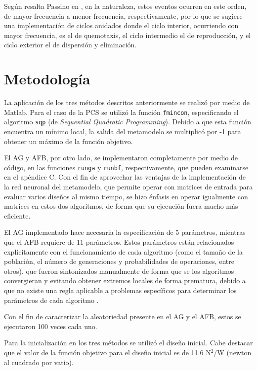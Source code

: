 Según resalta Passino en \cite{passino2002}, en la naturaleza, estos eventos ocurren en este orden, de mayor frecuencia a menor frecuencia, respectivamente, por lo que se sugiere una implementación de ciclos anidados donde el ciclo interior, ocurriendo con mayor frecuencia, es el de quemotaxis, el ciclo intermedio el de reproducción, y el ciclo exterior el de dispersión y eliminación.

\section{Metodología}
La aplicación de los tres métodos descritos anteriormente se realizó por medio de Matlab. Para el caso de la PCS se utilizó la función \texttt{fmincon}, especificando el algoritmo \texttt{sqp} (de \textit{Sequential Quadratic Programming}). Debido a que esta función encuentra un mínimo local, la salida del metamodelo se multiplicó por -1 para obtener un máximo de la función objetivo.

El AG y AFB, por otro lado, se implementaron completamente por medio de código, en las funciones \texttt{runga} y \texttt{runbf}, respectivamente, que pueden examinarse en el apéndice C. Con el fin de aprovechar las ventajas de la implementación de la red neuronal del metamodelo, que permite operar con matrices de entrada para evaluar varios diseños al mismo tiempo, se hizo énfasis en operar igualmente con matrices en estos dos algoritmos, de forma que su ejecución fuera mucho más eficiente.

El AG implementado hace necesaria la especificación de 5 parámetros, mientras que el AFB requiere de 11 parámetros. Estos parámetros están relacionados explícitamente con el funcionamiento de cada algoritmo (como el tamaño de la población, el número de generaciones y probabilidades de operaciones, entre otros), que fueron sintonizados manualmente de forma que se los algoritmos convergieran y evitando obtener extremos locales de forma prematura, debido a que no existe una regla aplicable a problemas específicos para determinar los parámetros de cada algoritmo \cite{goldberg1989,passino2002}.

Con el fin de caracterizar la aleatoriedad presente en el AG y el AFB, estos se ejecutaron 100 veces cada uno. 

Para la inicialización en los tres métodos se utilizó el diseño inicial. Cabe destacar que el valor de la función objetivo para el diseño inicial es de 11.6 N$^2$/W (newton al cuadrado por vatio).


